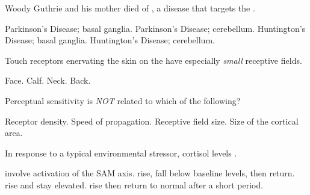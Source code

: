 \documentclass[answers]{exam}
\begin{document}
\begin{questions}
\newpage

\question Woody Guthrie and his mother died of \fillin, a disease that targets the \fillin.
\begin{choices}
\choice Parkinson’s Disease; basal ganglia.
\choice Parkinson’s Disease; cerebellum.
\correctchoice Huntington’s Disease; basal ganglia.
\choice Huntington’s Disease; cerebellum.
\end{choices}

\question Touch receptors enervating the skin on the \fillin have especially \emph{small} receptive fields.
\begin{choices}
\correctchoice Face.
\choice Calf.
\choice Neck.
\choice Back.
\end{choices}

\question Perceptual sensitivity is \emph{NOT} related to which of the following?
\begin{choices}
\choice Receptor density.
\correctchoice Speed of propagation.
\choice Receptive field size.
\choice Size of the cortical area.
\end{choices}

\question In response to a typical environmental stressor, cortisol levels \fillin.
\begin{choices}
\choice involve activation of the SAM axis.
\choice rise, fall below baseline levels, then return.
\choice rise and stay elevated.
\correctchoice rise then return to normal after a short period.
\end{choices}



\end{questions}
\end{document}
